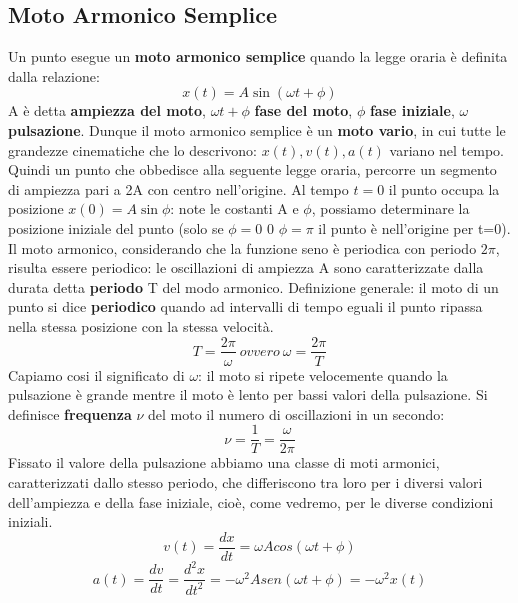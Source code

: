 \documentclass{article}
\numberwithin{equation}{subsection}
\begin{document}
\subsection{Moto Armonico Semplice}
Un punto esegue un \textbf{moto armonico semplice} quando la legge oraria è definita dalla relazione:
\begin{equation}
    x(t)=A\sin({\omega t + \phi})
\end{equation}
A è detta \textbf{ampiezza del moto}, $\omega t + \phi$ \textbf{fase del moto}, $\phi$ \textbf{fase iniziale}, $\omega$ \textbf{pulsazione}. Dunque il moto armonico semplice è un \textbf{moto vario}, in cui tutte le grandezze cinematiche che lo descrivono: $x(t),v(t), a(t)$ variano nel tempo. Quindi un punto che obbedisce alla seguente legge oraria, percorre un segmento di ampiezza pari a 2A con centro nell'origine. Al tempo $t=0$ il punto occupa la posizione $x(0)=A\sin\phi$: note le costanti A e $\phi$, possiamo determinare la posizione iniziale del punto (solo se $\phi=0$ 0 $\phi=\pi$ il punto è nell'origine per t=0). Il moto armonico, considerando che la funzione seno è periodica con periodo $2\pi$, risulta essere periodico: le oscillazioni di ampiezza A sono caratterizzate dalla durata detta \textbf{periodo} T del modo armonico. Definizione generale: il moto di un punto si dice \textbf{periodico} quando ad intervalli di tempo eguali il punto ripassa nella stessa posizione con la stessa velocità.
\begin{equation}
    T=\frac{2\pi}{\omega} \ ovvero \ \omega=\frac{2\pi}{T}
\end{equation}
Capiamo cosi il significato di $\omega$: il moto si ripete velocemente quando la pulsazione è grande mentre il moto è lento per bassi valori della pulsazione. Si definisce \textbf{frequenza} $\nu$ del moto il numero di oscillazioni in un secondo:
\begin{equation}
    \nu = \frac{1}{T}=\frac{\omega}{2\pi}
\end{equation}
Fissato il valore della pulsazione abbiamo una classe di moti armonici, caratterizzati dallo stesso periodo, che differiscono tra loro per i diversi valori dell'ampiezza e della fase iniziale, cioè, come vedremo, per le diverse condizioni iniziali.
\begin{equation}
    v(t)=\frac{dx}{dt}=\omega Acos(\omega t+ \phi)
\end{equation}
\begin{equation}
    a(t)=\frac{dv}{dt}=\frac{d^2x}{dt^2}=-\omega^2Asen(\omega t + \phi) = -\omega^2 x(t)
\end{equation}
\end{document}
